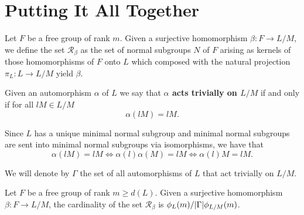 \section{Putting It All Together}


\begin{definition}
    Let $F$ be a free group of rank $m$. Given a surjective homomorphism $\beta \colon F \rightarrow L/M$, we define the set $\mathscr{R}_\beta$ as the set of normal subgroups $N$ of $F$ arising as kernels of those homomorphisms of $F$ onto $L$ which composed with the natural projection $\pi_L \colon L \rightarrow L/M$ yield $\beta$.
\end{definition}

\begin{definition}
    Given an automorphism $\alpha$ of $L$ we say that \textbf{$\alpha$ acts trivially on $L/M$} if and only if for all $lM \in L/M$
    $$
    \alpha(lM) = lM.
    $$    
\end{definition}

Since $L$ has a unique minimal normal subgroup and minimal normal subgroups are sent into minimal normal subgroups via isomorphisms, we have that 
$$
\alpha(lM) = lM \iff \alpha(l)\alpha(M) = lM \iff \alpha(l)M = lM.
$$

\begin{definition}
    We will denote by $\Gamma$ the set of all automorphisms of $L$ that act trivially on $L/M$.    
\end{definition}

\begin{theorem}
    \label{PHallT}
    Let $F$ be a free group of rank $m \ge d(L)$. Given a surjective homomorphism $\beta \colon F \rightarrow L/M$, the cardinality of the set $\mathscr{R}_{\beta}$ is $\phi_L(m)/| \Gamma |\phi_{L/M}(m)$. 
\end{theorem}

